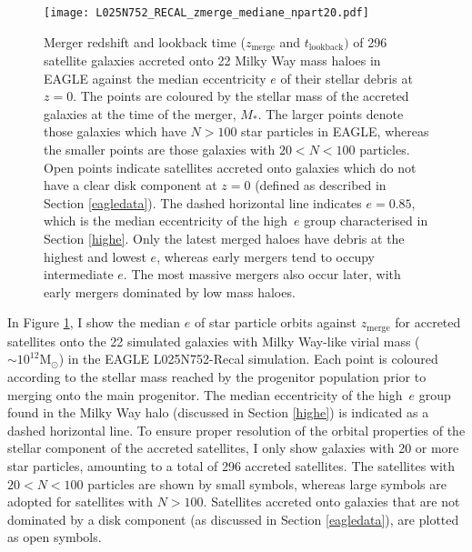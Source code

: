 \begin{figure}
\texttt{[image: L025N752\_RECAL\_zmerge\_mediane\_npart20.pdf]}
\caption[Median eccentricity of satellites accreted onto Milky Way mass haloes as a function of their merger time, in the Recal-L025N0752 EAGLE simulation]{\label{fig:eagle}Merger redshift and lookback
time ($z_\mathrm{merge}$ and $t_{\mathrm{lookback}})$ of 296
satellite galaxies accreted onto 22 Milky Way mass haloes in EAGLE
against the median eccentricity $e$ of their stellar debris at
$z=0$. The points are coloured by the stellar mass of the accreted
galaxies at the time of the merger, $M_*$. The larger points denote
those galaxies which have $N > 100$ star particles in EAGLE, whereas
the smaller points are those galaxies with $20 < N < 100$ particles.
Open points indicate satellites accreted onto galaxies which do not
have a clear disk component at $z=0$ (defined as described in Section
\ref{eagledata}). The dashed horizontal line indicates $e = 0.85$,
which is the median eccentricity of the high~$e$ group characterised
in Section \ref{highe}. Only the latest merged haloes have debris
at the highest and lowest $e$, whereas early mergers tend to occupy
intermediate $e$. The most massive mergers also occur later, with
early mergers dominated by low mass haloes.}
\end{figure}

In Figure \ref{fig:eagle},
I show the median $e$ of star particle orbits against
$z_\mathrm{merge}$ for accreted satellites onto the 22
simulated galaxies with Milky Way-like virial mass ($\sim 10^{12}
\mathrm{M_{\odot}}$) in the EAGLE L025N752-Recal simulation.
Each point is coloured according to the stellar mass reached
by the progenitor population prior to merging onto the main
progenitor. The median eccentricity of the high~$e$ group
found in the Milky Way halo (discussed in Section \ref{highe}) is indicated as a dashed horizontal line. To
ensure proper resolution of the orbital properties of the stellar
component of the accreted satellites, I only show galaxies with
20 or more star particles, amounting to a total of 296 accreted
satellites. The satellites with $20 < N < 100$ particles are shown
by small symbols, whereas large symbols are adopted
for satellites with $N > 100$.  Satellites accreted onto
galaxies that are not dominated by a disk component (as discussed
in Section \ref{eagledata}), are plotted as open symbols.

